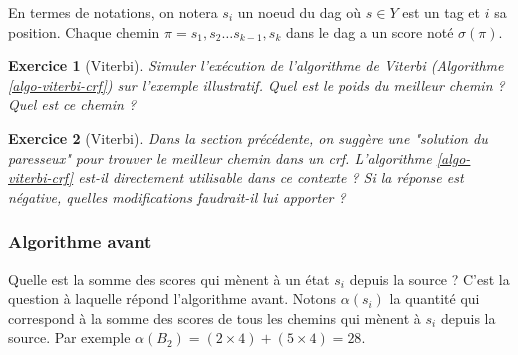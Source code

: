 \documentclass[11pt,openany]{book}
\newtheorem{exo}{Exercice}[chapter]
\newcommand{\ac}[1]{{\sc #1}} %
\begin{document}
En termes de notations, on notera $s_i$ un noeud du \ac{dag} où $s\in Y$ est un tag et $i$ sa position. Chaque chemin $\pi = s_1,s_2\ldots s_{k-1},s_k$ dans le \ac{dag} a un score noté $\sigma(\pi)$.  



\begin{algorithm}[htbp]
\caption{\label{algo-viterbi-crf}Algorithme de Viterbi pour \ac{crf}}
\end{algorithm}
 
\begin{exo}[Viterbi]
Simuler l'exécution de l'algorithme de Viterbi (Algorithme \ref{algo-viterbi-crf}) sur l'exemple illustratif. Quel est le poids du meilleur chemin ? Quel est ce chemin ? 
\end{exo}

\begin{exo}[Viterbi]
Dans la section précédente, on suggère une "solution du paresseux" pour trouver le meilleur chemin dans un \ac{crf}.  L'algorithme \ref{algo-viterbi-crf} est-il directement utilisable dans ce contexte ? Si la réponse est négative, quelles modifications faudrait-il lui apporter ?
\end{exo}




\subsubsection{Algorithme avant} Quelle est la somme des scores qui mènent à un état $s_i$ depuis la source ? C'est la question à laquelle répond l'algorithme avant.
Notons $\alpha(s_i)$ la quantité qui correspond à la somme des scores de tous les chemins qui mènent à $s_i$ depuis la source. Par exemple $\alpha(B_2) = (2) + (5) = 28$.
\end{document}
